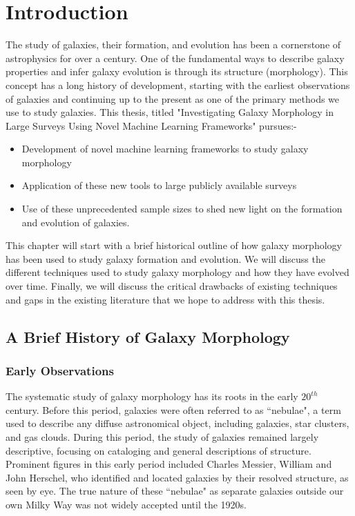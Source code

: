 \chapter{Introduction} \label{chap:intro}

The study of galaxies, their formation, and evolution has been a cornerstone of astrophysics for over a century. One of the fundamental ways to describe galaxy properties and infer galaxy evolution is through its structure (morphology). This concept has a long history of development, starting with the earliest observations of galaxies and continuing up to the present as one of the primary methods we use to study galaxies. This thesis, titled "Investigating Galaxy Morphology in Large Surveys Using Novel Machine Learning Frameworks" pursues:-

\begin{itemize}
    \item Development of novel machine learning frameworks to study galaxy morphology
    \item Application of these new tools to large publicly available surveys
    \item Use of these unprecedented sample sizes to shed new light on the formation and evolution of galaxies. 
\end{itemize}

This chapter will start with a brief historical outline of how galaxy morphology has been used to study galaxy formation and evolution. We will discuss the different techniques used to study galaxy morphology and how they have evolved over time. Finally, we will discuss the critical drawbacks of existing techniques and gaps in the existing literature that we hope to address with this thesis. 

\section{A Brief History of Galaxy Morphology} \label{sec_intro:history}

\subsection{Early Observations} \label{sec_intro:early_obs}

The systematic study of galaxy morphology has its roots in the early $20^{th}$ century. Before this period, galaxies were often referred to as ``nebulae", a term used to describe any diffuse astronomical object, including galaxies, star clusters, and gas clouds. During this period, the study of galaxies remained largely descriptive, focusing on cataloging and general descriptions of structure. Prominent figures in this early period included Charles Messier, William and John Herschel, who identified and located galaxies by their resolved structure, as seen by eye. The true nature of these ``nebulae" as separate galaxies outside our own Milky Way was not widely accepted until the 1920s.

